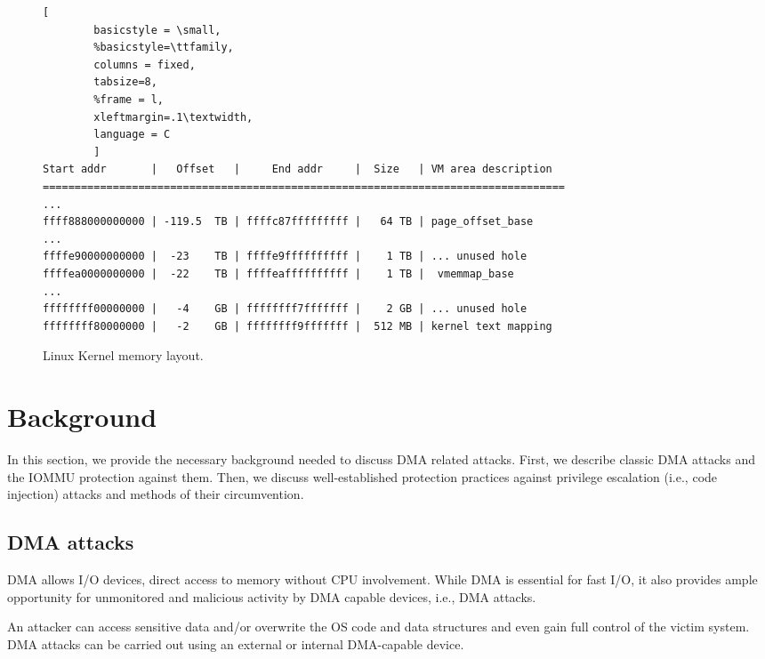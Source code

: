 \begin{figure*}[t]

        \begin{lstlisting}[
        basicstyle = \small,
        %basicstyle=\ttfamily,
        columns = fixed,
        tabsize=8,
        %frame = l,
        xleftmargin=.1\textwidth,
        language = C
        ]
Start addr       |   Offset   |     End addr     |  Size   | VM area description
==================================================================================
...
ffff888000000000 | -119.5  TB | ffffc87fffffffff |   64 TB | page_offset_base
...
ffffe90000000000 |  -23    TB | ffffe9ffffffffff |    1 TB | ... unused hole
ffffea0000000000 |  -22    TB | ffffeaffffffffff |    1 TB |  vmemmap_base
...
ffffffff00000000 |   -4    GB | ffffffff7fffffff |    2 GB | ... unused hole
ffffffff80000000 |   -2    GB | ffffffff9fffffff |  512 MB | kernel text mapping
                \end{lstlisting}
        \caption{ Linux Kernel memory layout.}
        \label{fig:mem_layot}

\end{figure*}

\section{Background}\label{sec:background}

In this section, we provide the necessary background needed to discuss DMA related attacks. First, we describe classic DMA attacks and the IOMMU protection against them. Then, we discuss well-established protection practices against privilege escalation (i.e., code injection) attacks and methods of their circumvention.

\subsection{DMA attacks}

DMA allows I/O devices, direct access to memory \cite{oC54} without CPU involvement. While DMA is essential for fast I/O, it also provides ample opportunity for unmonitored and malicious activity by DMA capable devices, i.e., DMA attacks. 

An attacker can access sensitive data and/or overwrite the OS code and data structures and even gain full control of the victim system. DMA attacks can be carried out using an external or internal DMA-capable device. 

